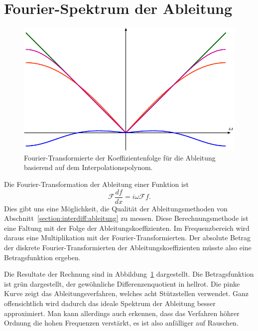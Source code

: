 %
%
%
\section{Fourier-Spektrum der Ableitung}
\begin{figure}
\centering
\includegraphics{papers/interdiff/experiment.pdf}
\caption{Fourier-Transformierte der Koeffizientenfolge für die Ableitung 
basierend auf dem Interpolationspolynom.
\label{interdiff:spektrum}}
\end{figure}
Die Fourier-Transformation der Ableitung einer Funktion ist
\[
\mathcal{F}
\frac{df}{dx}
=
i\omega\mathcal{F}f.
\]
%
Dies gibt uns eine Möglichkeit, die Qualität der Ableitungsmethoden
von Abschnitt~\ref{section:interdiff:ableitung} zu messen.
Diese Berechnungsmethode ist eine Faltung mit der Folge der
Ableitungskoeffizienten.
Im Frequenzbereich wird daraus eine Multiplikation mit der
Fourier-Transformierten.
Der absolute Betrag der diskrete Fourier-Transformierten
der Ableitungskoeffizienten müsste also eine Betragsfunktion ergeben.

Die Resultate der Rechnung sind in Abbildung~\ref{interdiff:spektrum}
dargestellt.
Die Betragsfunktion ist grün dargestellt,
der gewöhnliche Differenzenquotient in hellrot.
Die pinke Kurve zeigt das Ableitungsverfahren, welches acht
Stützstellen verwendet.
Ganz offensichtlich wird dadurch das ideale Spektrum der
Ableitung besser approximiert.
Man kann allerdings auch erkennen, dass das Verfahren höhrer Ordnung
die hohen Frequenzen verstärkt, es ist also anfälliger auf Rauschen.



